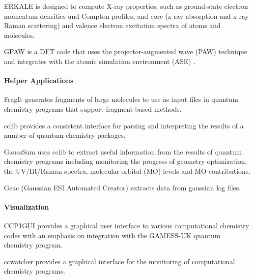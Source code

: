 ERKALE \cite{Lehtola_2012} is designed to compute X-ray properties, such as ground-state electron momentum densities and Compton profiles, and core (x-ray absorption and x-ray Raman scattering) and valence electron excitation spectra of atoms and molecules.

GPAW \cite{gpaw} is a DFT code that uses the projector-augmented wave (PAW) technique \cite{Bl_chl_1994,Kresse_1999} and integrates with the  atomic simulation environment (ASE)  \cite{Bahn_2002}. 



\paragraph{Helper Applications}
FragIt \cite{Steinmann_2012} generates fragments of large molecules to use as input files in quantum chemistry programs that support fragment based methods.

cclib \cite{O_boyle_2008} provides a consistent interface for parsing and interpreting the results of a number of quantum chemistry packages. 

GaussSum \cite{O_boyle_2008} uses cclib to extract useful information from the results of quantum chemistry programs including monitoring the progress of geometry optimization, the UV/IR/Raman spectra, molecular orbital (MO) levels and MO contributions.

Geac (Gaussian ESI Automated Creator) extracts data from gaussian log files. 


\paragraph{Visualization}
CCP1GUI provides a graphical user interface to various computational chemistry codes with an emphasis on integration with the GAMESS-UK quantum chemistry program.

ccwatcher provides a graphical interface for the monitoring of computational chemistry programs.